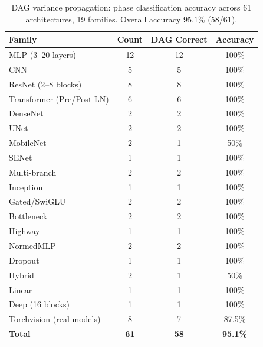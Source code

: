 \documentclass[10pt]{article}
\begin{document}
\begin{table}[t]
\centering
\caption{DAG variance propagation: phase classification accuracy across 61 architectures, 19 families. Overall accuracy $95.1\%$ (58/61).}
\label{tab:dag-results}
\small
\begin{tabular}{@{}lccc@{}}
\toprule
\textbf{Family} & \textbf{Count} & \textbf{DAG Correct} & \textbf{Accuracy} \\
\midrule
MLP (3--20 layers)        & 12 & 12 & 100\% \\
CNN                       & 5  & 5  & 100\% \\
ResNet (2--8 blocks)      & 8  & 8  & 100\% \\
Transformer (Pre/Post-LN) & 6  & 6  & 100\% \\
DenseNet                  & 2  & 2  & 100\% \\
UNet                      & 2  & 2  & 100\% \\
MobileNet                 & 2  & 1  & 50\% \\
SENet                     & 1  & 1  & 100\% \\
Multi-branch              & 2  & 2  & 100\% \\
Inception                 & 1  & 1  & 100\% \\
Gated/SwiGLU              & 2  & 2  & 100\% \\
Bottleneck                & 2  & 2  & 100\% \\
Highway                   & 1  & 1  & 100\% \\
NormedMLP                 & 2  & 2  & 100\% \\
Dropout                   & 1  & 1  & 100\% \\
Hybrid                    & 2  & 1  & 50\% \\
Linear                    & 1  & 1  & 100\% \\
Deep (16 blocks)          & 1  & 1  & 100\% \\
Torchvision (real models) & 8  & 7  & 87.5\% \\
\midrule
\textbf{Total}            & \textbf{61} & \textbf{58} & \textbf{95.1\%} \\
\bottomrule
\end{tabular}

\smallskip
{}
\end{table}
\end{document}

